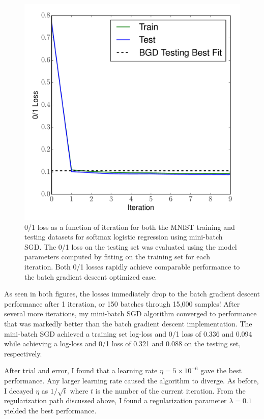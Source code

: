 \documentclass[12pt]{amsart}
\begin{document}
\begin{figure}[H]
	\includegraphics[width=\columnwidth]{sgd_mini_mnist_multi_train_test_01.pdf}
    \caption{0/1 loss as a function of iteration for both the MNIST training and testing datasets for softmax logistic regression using mini-batch SGD.  The 0/1 loss on the testing set was evaluated using the model parameters computed by fitting on the training set for each iteration.  Both 0/1 losses rapidly achieve comparable performance to the batch gradient descent optimized case.}
    \label{fig:sgd_mini_mnist_01}
\end{figure}

As seen in both figures, the losses immediately drop to the batch gradient descent performance after 1 iteration, or 150 batches through 15,000 samples!  After several more iterations, my mini-batch SGD algorithm converged to performance that was markedly better than the batch gradient descent implementation.  The mini-batch SGD achieved a training set log-loss and 0/1 loss of 0.336 and 0.094 while achieving a log-loss and 0/1 loss of 0.321 and 0.088 on the testing set, respectively.

After trial and error, I found that a learning rate $\eta = 5 \times 10^{-6}$ gave the best performance.  Any larger learning rate caused the algorithm to diverge.  As before, I decayed $\eta$ as $1/\sqrt{t}$ where $t$ is the number of the current iteration.  From the regularization path discussed above, I found a regularization parameter $\lambda = 0.1$ yielded the best performance.
\end{document}
